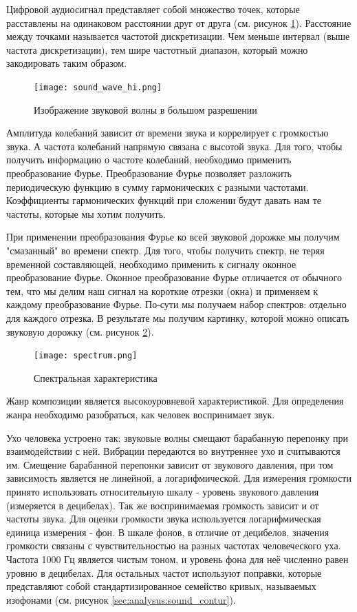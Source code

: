 Цифровой аудиосигнал представляет собой множество точек, которые расставлены на одинаковом расстоянии друг от друга (см. рисунок \ref{sec:analysus:sound_wave_hi}). Расстояние между точками называется частотой дискретизации. Чем меньше интервал (выше частота дискретизации), тем шире частотный диапазон, который можно закодировать таким образом.

\begin{figure}[t]
\centering
	\texttt{[image: sound\_wave\_hi.png]}
	\caption{Изображение звуковой волны в большом разрешении}
	\label{sec:analysus:sound_wave_hi}
\end{figure}

Амплитуда колебаний зависит от времени звука и коррелирует с громкостью звука. А частота колебаний напрямую связана с высотой звука. Для того, чтобы получить информацию о частоте колебаний, необходимо применить преобразование Фурье. Преобразование Фурье позволяет разложить периодическую функцию в сумму гармонических с разными частотами. Коэффициенты гармонических функций при сложении будут давать нам те частоты, которые мы хотим получить.

При применении преобразования Фурье ко всей звуковой дорожке мы получим "смазанный" во времени спектр. Для того, чтобы получить спектр, не теряя временной составляющей, необходимо применить к сигналу оконное преобразование Фурье. Оконное преобразование Фурье отличается от обычного тем, что мы делим наш сигнал на короткие отрезки (окна) и применяем к каждому преобразование Фурье. По-сути мы получаем набор спектров: отдельно для каждого отрезка. В результате мы получим картинку, которой можно описать звуковую дорожку (см. рисунок \ref{sec:analysus:spectrum}).

\begin{figure}[h]
\centering
	\texttt{[image: spectrum.png]}
	\caption{Спектральная характеристика}
	\label{sec:analysus:spectrum}
\end{figure}

Жанр композиции является высокоуровневой характеристикой. Для определения жанра необходимо разобраться, как человек воспринимает звук.

Ухо человека устроено так: звуковые волны смещают барабанную перепонку при взаимодействии с ней. Вибрации передаются во внутреннее ухо и считываются им. Смещение барабанной перепонки зависит от звукового давления, при том зависимость является не линейной, а логарифмической. Для измерения громкости принято использовать относительную шкалу - уровень звукового давления (измеряется в децибелах). Так же воспринимаемая громкость зависит и от частоты звука. Для оценки громкости звука используется логарифмическая единица измерения - фон. В шкале фонов, в отличие от децибелов, значения громкости связаны с чувствительностью на разных частотах человеческого уха. Частота 1000 Гц является чистым тоном, и уровень фона для неё численно равен уровню в децибелах. Для остальных частот используют поправки, которые представляют собой стандартизированное семейство кривых, называемых изофонами (см. рисунок \ref{sec:analysus:sound_contur}).

